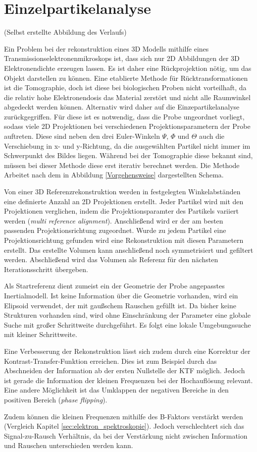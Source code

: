 \section{Einzelpartikelanalyse}
\label{einzelpartikelanalyse}
(Selbst erstellte Abbildung des Verlaufs)

Ein Problem bei der rekonstruktion eines 3D Modells mithilfe eines Transmissionselektronenmikroskops ist, dass sich nur 2D Abbildungen der 3D Elektronendichte erzeugen lassen.
Es ist daher eine Rückprojektion nötig, um das Objekt darstellen zu können.
Eine etablierte Methode für Rücktransformationen ist die Tomographie, doch ist diese bei biologischen Proben nicht vorteilhaft, da die relativ hohe Elektronendosis das Material zerstört und nicht alle Raumwinkel abgedeckt werden können.
Alternativ wird daher auf die Einzepartikelanalyse zurückgegriffen.
Für diese ist es notwendig, dass die Probe ungeordnet vorliegt, sodass viele 2D Projektionen bei verschiedenen Projektionsparametern der Probe auftreten.
Diese sind neben den drei Euler-Winkeln $\Psi$, $\Phi$ und $\Theta$ auch die Verschiebung in x- und y-Richtung, da die ausgewählten Partikel nicht immer im Schwerpunkt des Bildes liegen.
Während bei der Tomographie diese bekannt sind, müssen bei dieser Methode diese erst iterativ berechnet werden.
Die Methode Arbeitet nach dem in Abbildung \ref{Vorgehensweise} dargestellten Schema.

Von einer 3D Referenzrekonstruktion werden in festgelegten Winkelabständen eine definierte Anzahl an 2D Projektionen erstellt.
Jeder Partikel wird mit den Projektionen verglichen, indem die Projektionsparamter des Partikels variiert werden (\textit{multi reference alignment}). 
Anschließend wird er der am besten passenden Projektionsrichtung zugeordnet.
Wurde zu jedem Partikel eine Projektionsrichtung gefunden wird eine Rekonstruktion mit diesen Parametern erstellt.
Das erstellte Volumen kann anschließend noch symmetrisiert und gefiltert werden.
Abschließend wird das Volumen als Referenz für den nächsten Iterationsschritt übergeben.

Als Startreferenz dient zumeist ein der Geometrie der Probe angepasstes Inertialmodell.
Ist keine Information über die Geometrie vorhanden, wird ein Elipsoid verwendet, der mit gaußschem Rauschen gefüllt ist.
Da bisher keine Strukturen vorhanden sind, wird ohne Einschränkung der Parameter eine globale Suche mit großer Schrittweite durchgeführt.
Es folgt eine lokale Umgebungssuche mit kleiner Schrittweite.

Eine Verbesserung der Rekonstruktion lässt sich zudem durch eine Korrektur der Kontrast-Transfer-Funktion erreichen.
Dies ist zum Beispiel durch das Abschneiden der Information ab der ersten Nullstelle der KTF möglich. 
Jedoch ist gerade die Information der kleinen Frequenzen bei der Hochauflösung relevant.
Eine andere Möglichkeit ist das Umklappen der negativen Bereiche in den positiven Bereich (\textit{phase flipping}).

Zudem können die kleinen Frequenzen mithilfe des B-Faktors verstärkt werden (Vergleich Kapitel \ref{sec:elektron_spektroskopie}). 
Jedoch verschlechtert sich das Signal-zu-Rausch Verhältnis, da bei der Verstärkung nicht zwischen Information und Rauschen unterschieden werden kann.

\FloatBarrier